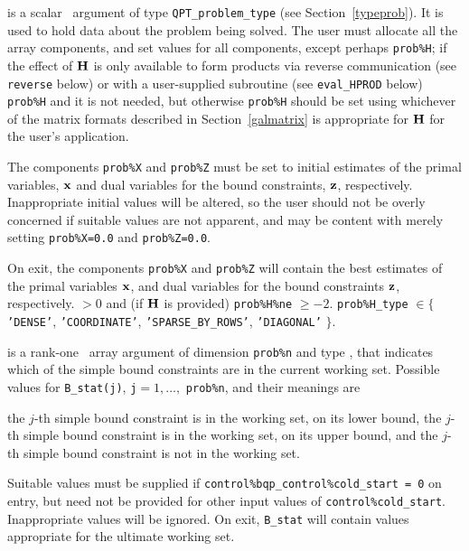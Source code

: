 \documentclass{galahad}
\begin{document}
\vspace*{-3mm}
\begin{description}
 is a scalar \intentinout\ argument of type 
{\tt QPT\_problem\_type}
(see Section~\ref{typeprob}). 
It is used to hold data about the problem being solved.
The user must allocate all the array components,
and set values for all components, except perhaps {\tt prob\%H};
if the effect of ${\mathbf{H}}$ is only available to form products 
via reverse communication (see {\tt reverse} below)
or with a user-supplied subroutine (see {\tt eval\_HPROD} below)
{\tt prob\%H} and it is not needed, but otherwise {\tt prob\%H} should be
set using whichever
of the matrix formats described in Section~\ref{galmatrix} 
is appropriate for ${\mathbf{H}}$ for the user's application.

The components {\tt prob\%X} and {\tt prob\%Z}
must be set to initial estimates of the primal variables, 
${\mathbf{x}}$ and dual variables for the bound constraints, ${\mathbf{z}}$, respectively.
Inappropriate initial values will be altered, so the user should
not be overly concerned if suitable values are not apparent, and may be
content with merely setting {\tt prob\%X=0.0}
and {\tt prob\%Z=0.0}.

On exit, the components {\tt prob\%X} and {\tt prob\%Z}
will contain the best estimates of the primal variables ${\mathbf{x}}$, 
and dual variables for the bound constraints ${\mathbf{z}}$, respectively.
 $> 0$
              and (if ${\mathbf{H}}$ is provided) {\tt prob\%H\%ne} $\geq -2$.
{\tt prob\%H\_type} $\in \{${\tt 'DENSE'}, 
 {\tt 'COORDINATE'}, {\tt 'SPARSE\_BY\_\-ROWS'}, {\tt 'DIAGONAL'} $\}$. 

 is a rank-one \intentinout\ array argument of dimension {\tt prob\%n}
and type \integer, that indicates which of the simple bound 
constraints are in the current working set. Possible values for 
{\tt B\_stat(j)}, {\tt j}$=1, \ldots ,$ {\tt prob\%n}, and their meanings are
\begin{description}
 the $j$-th simple bound constraint 
is in the working set, on its lower bound,
 the $j$-th simple bound constraint 
is in the working set, on its upper bound, and
  the $j$-th simple bound constraint is not in the working set.
\end{description}
Suitable values must be supplied if 
{\tt control\%bqp\_control\%cold\_start = 0} on entry,
but need not be provided for other input values of {\tt control\%cold\_start}.
Inappropriate values will be ignored.
On exit, {\tt B\_stat} will contain values appropriate for the ultimate
working set.


\end{description}
\end{document}
